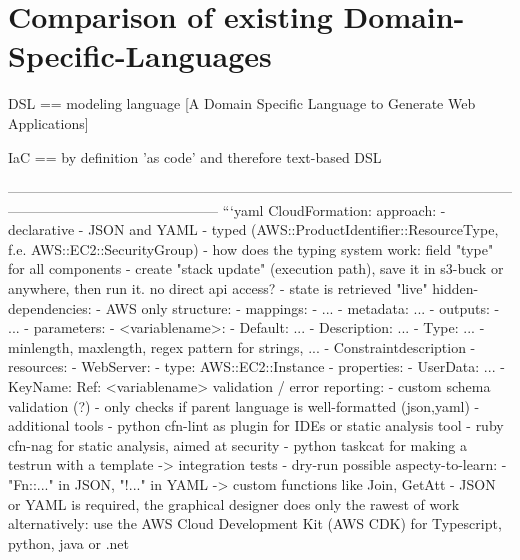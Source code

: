 \section{Comparison of existing Domain-Specific-Languages}
DSL == modeling language [A Domain Specific Language to Generate Web Applications]

IaC == by definition 'as code' and therefore text-based DSL

---------------------------------------------------------------------------------------------------------------------------------------------------------
```yaml
CloudFormation: %
  approach:
    - declarative
    - JSON and YAML
    - typed (AWS::ProductIdentifier::ResourceType, f.e. AWS::EC2::SecurityGroup) - how does the typing system work: field "type" for all components
    - create "stack update" (execution path), save it in s3-buck or anywhere, then run it. no direct api access?
    - state is retrieved "live"
  hidden-dependencies:
    - AWS only
  structure:
    - mappings: %
      - ... %
    - metadata: ... %
    - outputs: %
      - ... %
    - parameters:
      - <variablename>:
        - Default: ...
        - Description: ...
        - Type: ...
        - minlength, maxlength, regex pattern for strings, ...
        - Constraintdescription
    - resources: %
      - WebServer: %
        - type: AWS::EC2::Instance
        - properties:
          - UserData: ... %
          - KeyName:
            Ref: <variablename> %
  validation / error reporting:
    - custom schema validation (?)
    - only checks if parent language is well-formatted (json,yaml)
    - additional tools
      - python cfn-lint as plugin for IDEs or static analysis tool
      - ruby cfn-nag for static analysis, aimed at security
      - python taskcat for making a testrun with a template -> integration tests
    - dry-run possible
  aspecty-to-learn:
    - "Fn::..." in JSON, "!..." in YAML -> custom functions like Join, GetAtt
    - JSON or YAML is required, the graphical designer does only the rawest of work
      alternatively: use the AWS Cloud Development Kit (AWS CDK) for Typescript, python, java or .net
